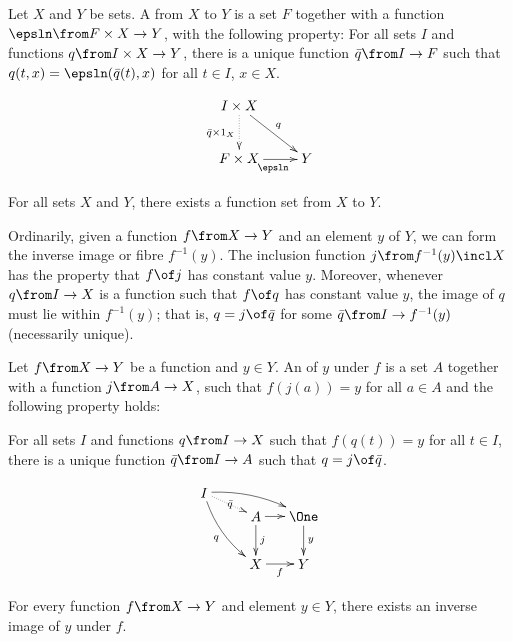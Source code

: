 \documentclass[12pt]{article}
\begin{document}
\begin{dfn}
Let $X$ and $Y$ be sets.  A  from $X$ to $Y$ is a
set $F$ together with a function $\epsln\from F \times X \to Y$, with the
following property: 
% 
\medskip\noindent
For all sets $I$ and functions $q\from I \times X \to Y$,
there is a unique function $\bar{q}\from I \to F$
such that 
$q(t, x) = \epsln (\bar{q}(t), x)$ for all $t \in I$, $x \in X$.
\end{dfn}
\[
\xymatrix{
I \times X \ar@{.>}[d]_{\bar{q} \times 1_X} \ar[rd]^q   &       \\
F \times X \ar[r]_\epsln                                &Y
}
\]
% 
\begin{axiom}
For all sets $X$ and $Y$, there exists a function set from $X$ to $Y$.
\end{axiom}


% 
Ordinarily, given a function $f\from X \to Y$ and an element $y$ of $Y$, we
can form the inverse image or fibre $f^{-1}(y)$.  The inclusion function $j
\from f^{-1}(y) \incl X$ has the property that $f\of j$ has constant value
$y$.  Moreover, whenever $q \from I \to X$ is a function such that $f \of
q$ has constant value $y$, the image of $q$ must lie within $f^{-1}(y)$;
that is, $q = j \of \bar{q}$ for some $\bar{q}\from I \to f^{-1}(y)$
(necessarily unique).

\begin{dfn}
Let $f\from X \to Y$ be a function and $y \in Y$.  An 
of $y$ under $f$ is a set $A$ together with a function $j\from A \to X$, such
that $f(j(a)) = y$ for all $a \in A$ and the following property holds:

\medskip\noindent
For all sets $I$ and functions $q \from I \to X$ such that
$f(q(t)) = y$ for all $t \in I$,
there is a unique function $\bar{q} \from I \to A$
such that $q = j \of \bar{q}$.  
\end{dfn}
\[
\begin{xy}
(0,12)*+{A}="inv";
(12,12)*+{\One}="one";
(0,0)*+{X}="dom";
(12,0)*+{Y}="cod";
(-13,18)*+{I}="test";
{\ar^j "inv"; "dom"};
{\ar "inv"; "one"};
{\ar_f "dom"; "cod"};
{\ar^y "one"; "cod"};
{\ar@/_/_{q} "test"; "dom"};
{\ar@/^/ "test"; "one"};
{\ar@{.>}|{\bar{q}} "test"; "inv"};
\end{xy}
\]

\begin{axiom}
For every function $f\from X \to Y$ and element $y \in Y$, there exists an
inverse image of $y$ under $f$.
\end{axiom}
\end{document}
